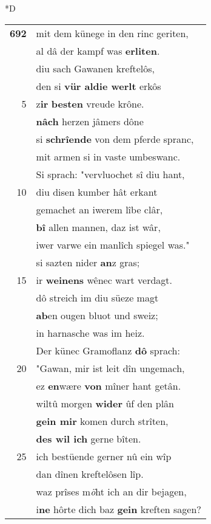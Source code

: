 \documentclass[8pt,a4paper,notitlepage]{article}
\begin{document}
\begin{table}[ht]
\begin{minipage}[t]{0.5\linewidth}
\small
\begin{center}*D
\end{center}
\begin{tabular}{rl}
\textbf{692} & mit dem künege in den rinc geriten,\\ 
 & al dâ der kampf was \textbf{erliten}.\\ 
 & diu sach Gawanen kreftelôs,\\ 
 & den si \textbf{vür aldie werlt} erkôs\\ 
5 & z\textbf{ir} \textbf{besten} vreude krône.\\ 
 & \textbf{nâch} herzen jâmers dône\\ 
 & si \textbf{schrîende} von dem pferde spranc,\\ 
 & mit armen si in vaste umbeswanc.\\ 
 & Si sprach: "vervluochet sî diu hant,\\ 
10 & diu disen kumber hât erkant\\ 
 & gemachet an iwerem lîbe clâr,\\ 
 & \textbf{bî} allen mannen, daz ist wâr,\\ 
 & iwer varwe ein manlîch spiegel was."\\ 
 & si sazten nider \textbf{an}z gras;\\ 
15 & ir \textbf{weinens} wênec wart verdagt.\\ 
 & dô streich im diu süeze magt\\ 
 & \textbf{ab}en ougen bluot und sweiz;\\ 
 & in harnasche was im heiz.\\ 
 & Der künec Gramoflanz \textbf{dô} sprach:\\ 
20 & "Gawan, mir ist leit dîn ungemach,\\ 
 & ez \textbf{en}wære \textbf{von} mîner hant getân.\\ 
 & wiltû morgen \textbf{wider} ûf den plân\\ 
 & \textbf{gein mir} komen durch strîten,\\ 
 & \textbf{des wil ich} gerne bîten.\\ 
25 & ich bestüende gerner nû ein wîp\\ 
 & dan dînen kreftelôsen lîp.\\ 
 & waz prîses m\textit{ö}ht ich an dir bejagen,\\ 
 & i\textbf{ne} hôrte dich baz \textbf{gein} kreften sagen?\\ 

\end{tabular}
\end{minipage}
\end{table}
\end{document}
